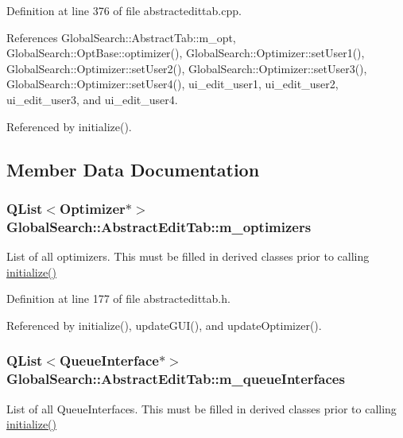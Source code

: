 Definition at line 376 of file abstractedittab.\+cpp.



References Global\+Search\+::\+Abstract\+Tab\+::m\+\_\+opt, Global\+Search\+::\+Opt\+Base\+::optimizer(), Global\+Search\+::\+Optimizer\+::set\+User1(), Global\+Search\+::\+Optimizer\+::set\+User2(), Global\+Search\+::\+Optimizer\+::set\+User3(), Global\+Search\+::\+Optimizer\+::set\+User4(), ui\+\_\+edit\+\_\+user1, ui\+\_\+edit\+\_\+user2, ui\+\_\+edit\+\_\+user3, and ui\+\_\+edit\+\_\+user4.



Referenced by initialize().



\subsection{Member Data Documentation}
\hypertarget{classGlobalSearch_1_1AbstractEditTab_a91f1cbcdf3321b4502aaa11074559eba}{}
\subsubsection[{m\+\_\+optimizers}]{\setlength{\rightskip}{0pt plus 5cm}Q\+List$<${\bf Optimizer}$\ast$$>$ Global\+Search\+::\+Abstract\+Edit\+Tab\+::m\+\_\+optimizers\hspace{0.3cm}{\ttfamily [protected]}}\label{classGlobalSearch_1_1AbstractEditTab_a91f1cbcdf3321b4502aaa11074559eba}
List of all optimizers. This must be filled in derived classes prior to calling \hyperlink{classGlobalSearch_1_1AbstractEditTab_afb9fd8fbcf71d7287a8117ce4d75a00b}{initialize()} 

Definition at line 177 of file abstractedittab.\+h.



Referenced by initialize(), update\+G\+U\+I(), and update\+Optimizer().

\hypertarget{classGlobalSearch_1_1AbstractEditTab_a364845072bfc0409a145c1cd6b60a60a}{}
\subsubsection[{m\+\_\+queue\+Interfaces}]{\setlength{\rightskip}{0pt plus 5cm}Q\+List$<${\bf Queue\+Interface}$\ast$$>$ Global\+Search\+::\+Abstract\+Edit\+Tab\+::m\+\_\+queue\+Interfaces\hspace{0.3cm}{\ttfamily [protected]}}\label{classGlobalSearch_1_1AbstractEditTab_a364845072bfc0409a145c1cd6b60a60a}
List of all Queue\+Interfaces. This must be filled in derived classes prior to calling \hyperlink{classGlobalSearch_1_1AbstractEditTab_afb9fd8fbcf71d7287a8117ce4d75a00b}{initialize()} 

